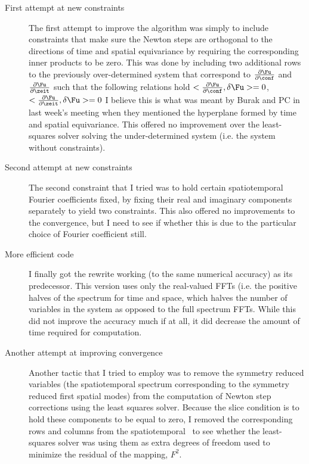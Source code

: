 \begin{description}
{\begin{description}
\item[First attempt at new constraints]
The first attempt to improve the algorithm was simply to include constraints that make sure the Newton steps
are orthogonal to the directions of time and spatial equivariance by requiring the corresponding
inner products to be zero. This was done by including two additional rows to the previously over-determined
system that correspond to $\frac{\partial \Fu}{\partial \conf}$ and $\frac{\partial \Fu}{\partial \zeit}$
such that the following relations hold $<\frac{\partial \Fu}{\partial \conf},\delta \Fu >=0$, $<\frac{\partial \Fu}{\partial \zeit},\delta \Fu >=0$
I believe this is what was meant by Burak and PC in last week's meeting when they mentioned the hyperplane formed
by time and spatial equivariance. This offered no improvement over the least-squares solver solving the under-determined
system (i.e. the system without constraints).

\item[Second attempt at new constraints]
The second constraint that I tried was to hold certain spatiotemporal Fourier coefficients fixed, by fixing their
real and imaginary components separately to yield two constraints. This also offered no improvements to the convergence,
but I need to see if whether this is due to the particular choice of Fourier coefficient still.

\item[More efficient code]
I finally got the rewrite working (to the same numerical accuracy) as its predecessor. This version uses only the
real-valued FFTs (i.e. the positive halves of the spectrum for time and space, which halves the number of variables
in the system as opposed to the full spectrum FFTs. While this did not improve the accuracy much if at all, it did
decrease the amount of time required for computation.

\item[Another attempt at improving convergence]
Another tactic that I tried to employ was to remove the symmetry reduced variables (the spatiotemporal spectrum
corresponding to the symmetry reduced first spatial modes) from the computation of Newton step corrections
using the least squares solver. Because the slice condition is to hold these components to be equal to zero,
I removed the corresponding rows and columns from the spatiotemporal \jacobianM\ to see whether the least-squares
solver was using them as extra degrees of freedom used to minimize the residual of the mapping, $F^{2}$.


\end{description}}
\end{description}
